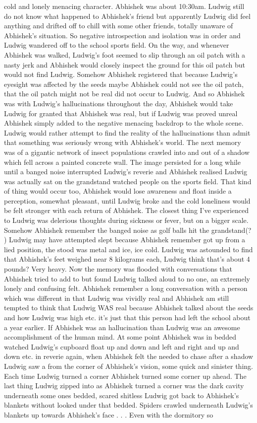 \documentclass[12pt]{book}
\begin{document}
cold and lonely menacing character. Abhishek was about 10:30am. Ludwig still do not know what happened to Abhishek's friend but apparently Ludwig did feel anything and drifted off to chill with some other friends, totally unaware of Abhishek's situation. So negative introspection and isolation was in order and Ludwig wandered off to the school sports field. On the way, and whenever Abhishek was walked, Ludwig's foot seemed to slip through an oil patch with a nasty jerk and Abhishek would closely inspect the ground for this oil patch but would not find Ludwig. Somehow Abhishek registered that because Ludwig's eyesight was affected by the seeds maybe Abhishek could not see the oil patch, that the oil patch might not be real did not occur to Ludwig. And so Abhishek was with Ludwig's hallucinations throughout the day, Abhishek would take Ludwig for granted that Abhishek was real, but if Ludwig was proved unreal Abhishek simply added to the negative menacing backdrop to the whole scene. Ludwig would rather attempt to find the reality of the hallucinations than admit that something was seriously wrong with Abhishek's world. The next memory was of a gigantic network of insect populations crawled into and out of a shadow which fell across a painted concrete wall. The image persisted for a long while until a banged noise interrupted Ludwig's reverie and Abhishek realised Ludwig was actually sat on the grandstand watched people on the sports field. That kind of thing would occur too, Abhishek would lose awareness and float inside a perception, somewhat pleasant, until Ludwig broke and the cold loneliness would be felt stronger with each return of Abhishek. The closest thing I've experienced to Ludwig was delerious thoughts during sickness or fever, but on a bigger scale. Somehow Abhishek remember the banged noise as golf balls hit the grandstand(? ) Ludwig may have attempted slept because Abhishek remember got up from a lied position, the stood was metal and ice, ice cold. Ludwig was astounded to find that Abhishek's feet weighed near 8 kilograms each, Ludwig think that's about 4 pounds? Very heavy. Now the memory was flooded with conversations that Abhishek tried to add to but found Ludwig talked aloud to no one, an extremely lonely and confusing felt. Abhishek remember a long conversation with a person which was different in that Ludwig was vividly real and Abhishek am still tempted to think that Ludwig WAS real because Abhishek talked about the seeds and how Ludwig was high etc. it's just that this person had left the school about a year earlier. If Abhishek was an hallucination than Ludwig was an awesome accomplishment of the human mind. At some point Abhishek was in bedded watched Ludwig's cupboard float up and down and left and right and up and down etc. in reverie again, when Abhishek felt the needed to chase after a shadow Ludwig saw a from the corner of Abhishek's vision, some quick and sinister thing. Each time Ludwig turned a corner Abhishek turned some corner up ahead. The last thing Ludwig zipped into as Abhishek turned a corner was the dark cavity underneath some ones bedded, scared shitless Ludwig got back to Abhishek's blankets without looked under that bedded. Spiders crawled underneath Ludwig's blankets up towards Abhishek's face . . .  Even with the dormitory so 
\end{document}
